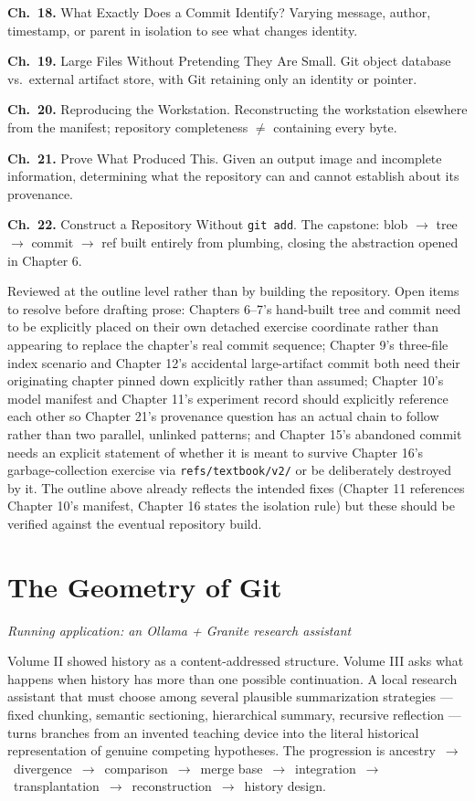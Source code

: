 \documentclass[11pt]{book}
\newcommand{\subheading}[1]{\bigskip\noindent{\bfseries\itshape #1}\smallskip\par}
\newcommand{\chapentry}[2]{\noindent\textbf{Ch.~#1.} #2\par\smallskip}
\begin{document}
\chapentry{18}{What Exactly Does a Commit Identify? Varying message, author, timestamp, or parent in isolation to see what changes identity.}
\chapentry{19}{Large Files Without Pretending They Are Small. Git object database vs.\ external artifact store, with Git retaining only an identity or pointer.}
\chapentry{20}{Reproducing the Workstation. Reconstructing the workstation elsewhere from the manifest; repository completeness $\neq$ containing every byte.}
\chapentry{21}{Prove What Produced This. Given an output image and incomplete information, determining what the repository can and cannot establish about its provenance.}
\chapentry{22}{Construct a Repository Without \texttt{git add}. The capstone: blob $\to$ tree $\to$ commit $\to$ ref built entirely from plumbing, closing the abstraction opened in Chapter 6.}

\subheading{Status and Open Items}
Reviewed at the outline level rather than by building the repository. Open items to resolve before drafting prose: Chapters 6--7's hand-built tree and commit need to be explicitly placed on their own detached exercise coordinate rather than appearing to replace the chapter's real commit sequence; Chapter 9's three-file index scenario and Chapter 12's accidental large-artifact commit both need their originating chapter pinned down explicitly rather than assumed; Chapter 10's model manifest and Chapter 11's experiment record should explicitly reference each other so Chapter 21's provenance question has an actual chain to follow rather than two parallel, unlinked patterns; and Chapter 15's abandoned commit needs an explicit statement of whether it is meant to survive Chapter 16's garbage-collection exercise via \texttt{refs/textbook/v2/} or be deliberately destroyed by it. The outline above already reflects the intended fixes (Chapter 11 references Chapter 10's manifest, Chapter 16 states the isolation rule) but these should be verified against the eventual repository build.

\chapter{The Geometry of Git}
\textit{Running application: an Ollama + Granite research assistant}

\subheading{Governing Idea}
Volume II showed history as a content-addressed structure. Volume III asks what happens when history has more than one possible continuation. A local research assistant that must choose among several plausible summarization strategies — fixed chunking, semantic sectioning, hierarchical summary, recursive reflection — turns branches from an invented teaching device into the literal historical representation of genuine competing hypotheses. The progression is ancestry~$\to$~divergence~$\to$~comparison~$\to$~merge base~$\to$~integration~$\to$~transplantation~$\to$~reconstruction~$\to$~history design.
\end{document}
